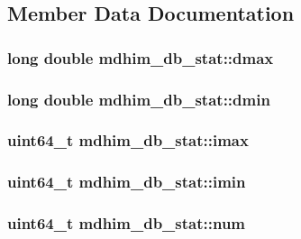 \subsection{Member Data Documentation}
\hypertarget{structmdhim__db__stat_a1ccd0e75db4b05ea4ef48b2e36c757f5}{
\subsubsection[{dmax}]{\setlength{\rightskip}{0pt plus 5cm}long double mdhim\-\_\-db\-\_\-stat\-::dmax}}\label{structmdhim__db__stat_a1ccd0e75db4b05ea4ef48b2e36c757f5}
\hypertarget{structmdhim__db__stat_ac1f4a8cb1a2a1c567245bc5b8ecfdc05}{
\subsubsection[{dmin}]{\setlength{\rightskip}{0pt plus 5cm}long double mdhim\-\_\-db\-\_\-stat\-::dmin}}\label{structmdhim__db__stat_ac1f4a8cb1a2a1c567245bc5b8ecfdc05}
\hypertarget{structmdhim__db__stat_a58ff0fbdb99c6f23d7cb8945c2f9b6e0}{
\subsubsection[{imax}]{\setlength{\rightskip}{0pt plus 5cm}uint64\-\_\-t mdhim\-\_\-db\-\_\-stat\-::imax}}\label{structmdhim__db__stat_a58ff0fbdb99c6f23d7cb8945c2f9b6e0}
\hypertarget{structmdhim__db__stat_a76f68ccd3a2fabdd949512ab7bcacd5d}{
\subsubsection[{imin}]{\setlength{\rightskip}{0pt plus 5cm}uint64\-\_\-t mdhim\-\_\-db\-\_\-stat\-::imin}}\label{structmdhim__db__stat_a76f68ccd3a2fabdd949512ab7bcacd5d}
\hypertarget{structmdhim__db__stat_a362426563ec5fbc354dfdbf31e68d691}{
\subsubsection[{num}]{\setlength{\rightskip}{0pt plus 5cm}uint64\-\_\-t mdhim\-\_\-db\-\_\-stat\-::num}}\label{structmdhim__db__stat_a362426563ec5fbc354dfdbf31e68d691}

